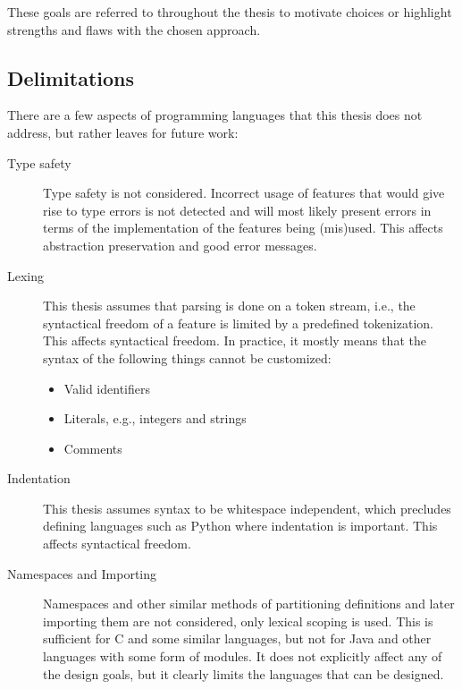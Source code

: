 \documentclass{kththesis}
\begin{document}
These goals are referred to throughout the thesis to motivate choices or highlight strengths and flaws with the chosen approach.

\subsection{Delimitations} \label{sec:delimitations}

There are a few aspects of programming languages that this thesis does not address, but rather leaves for future work:

\begin{description}
  \item[Type safety] Type safety is not considered. Incorrect usage of features that would give rise to type errors is not detected and will most likely present errors in terms of the implementation of the features being (mis)used. This affects abstraction preservation and good error messages.

  \item[Lexing] This thesis assumes that parsing is done on a token stream, i.e., the syntactical freedom of a feature is limited by a predefined tokenization. This affects syntactical freedom. In practice, it mostly means that the syntax of the following things cannot be customized:
  \begin{itemize}
    \item Valid identifiers
    \item Literals, e.g., integers and strings
    \item Comments
  \end{itemize}

  \item[Indentation] This thesis assumes syntax to be whitespace independent, which precludes defining languages such as Python where indentation is important. This affects syntactical freedom.

  \item[Namespaces and Importing] Namespaces and other similar methods of partitioning definitions and later importing them are not considered, only lexical scoping is used. This is sufficient for C and some similar languages, but not for Java and other languages with some form of modules. It does not explicitly affect any of the design goals, but it clearly limits the languages that can be designed.
\end{description}
\end{document}
